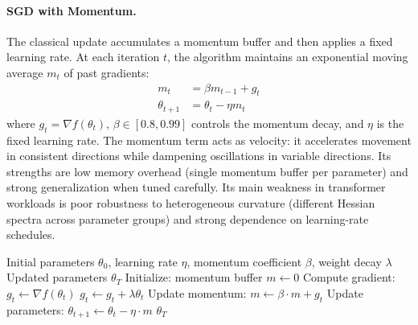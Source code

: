 \documentclass[11pt,a4paper]{article}
\begin{document}
\paragraph{SGD with Momentum.}
The classical update accumulates a momentum buffer and then applies a fixed learning rate. At each iteration $t$, the algorithm maintains an exponential moving average $m_t$ of past gradients:
\begin{align}
m_t &= \beta m_{t-1} + g_t \\
\theta_{t+1} &= \theta_t - \eta m_t
\end{align}
where $g_t = \nabla f(\theta_t)$, $\beta \in [0.8, 0.99]$ controls the momentum decay, and $\eta$ is the fixed learning rate. The momentum term acts as velocity: it accelerates movement in consistent directions while dampening oscillations in variable directions. Its strengths are low memory overhead (single momentum buffer per parameter) and strong generalization when tuned carefully. Its main weakness in transformer workloads is poor robustness to heterogeneous curvature (different Hessian spectra across parameter groups) and strong dependence on learning-rate schedules.

\begin{algorithm}[H]
\caption{SGD with Momentum}
\label{alg:sgd-momentum}
\begin{algorithmic}[1]
\Require Initial parameters $\theta_0$, learning rate $\eta$, momentum coefficient $\beta$, weight decay $\lambda$
\Ensure Updated parameters $\theta_T$
\State Initialize: momentum buffer $m \gets 0$
    \State Compute gradient: $g_t \gets \nabla f(\theta_t)$
        \State $g_t \gets g_t + \lambda \theta_t$ 
    \EndIf
    \State Update momentum: $m \gets \beta \cdot m + g_t$
    \State Update parameters: $\theta_{t+1} \gets \theta_t - \eta \cdot m$
\EndFor
\Return $\theta_T$
\end{algorithmic}
\end{algorithm}
\end{document}

